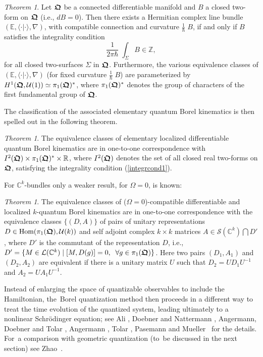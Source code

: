 \documentclass[12pt]{amsart}
\numberwithin{equation}{section}
\theoremstyle{remark}
\newtheorem{theorem}[defi]{Theorem}
\newcommand{\betheo}{\begin{theorem}}
\newcommand{\entheo}{\end{theorem}}
\newcommand{\be}{\begin{equation}}
\newcommand{\en}{\end{equation}}
\newcommand{\bfrakQ}{\mbox{\boldmath $\mathfrak Q$}}
\begin{document}
\betheo
Let $\bfrakQ$ be a connected differentiable manifold and $B$ a closed two-form
on $\bfrakQ$ (i.e., $dB = 0$). Then there exists a Hermitian complex line
bundle $(\mathbb E , \langle\cdot \vert\cdot\rangle , \nabla )$, with
compatible connection and curvature $\frac 1\hbar\;B$, if and only if $B$
satisfies the integrality condition
\be
  \frac 1{2\pi\hbar}\; \int_{\Sigma}B \in \mathbb Z ,
\label{integrcond1}
\en
for all closed two-surfaces $\Sigma$ in $\bfrakQ$. Furthermore, the various
equivalence classes of  $(\mathbb E , \langle\cdot\vert\cdot\rangle , \nabla )$
(for fixed curvature $\frac 1\hbar\;B$) are parameterized by $H^1 (\bfrakQ,
{\mathcal U}(1))\simeq \pi_1 (\bfrakQ )^*$, where $\pi_1 (\bfrakQ )^*$ denotes
the group of characters of the first fundamental group of $\bfrakQ$.
\entheo

The classification of the associated elementary quantum Borel kinematics is
then spelled out in the following theorem.

\betheo\label{classiftheo}
The equivalence classes of elementary localized
differentiable quantum Borel kinematics are in one-to-one correspondence with
$I^2 (\bfrakQ )\times \pi_1 (\bfrakQ )^* \times {\mathbb R}$, where $I^2
(\bfrakQ )$ denotes the set of all closed real two-forms on $\bfrakQ$,
satisfying the integrality condition (\ref{integrcond1}).
\entheo

For ${\mathbb C}^k$-bundles only a weaker result, for $\Omega = 0$, is known:

\betheo
The equivalence classes of ($\Omega = 0$)-compatible differentiable and
localized $k$-quantum Borel kinematics are in one-to-one correspondence with
the equivalence classes $\{(D, A)\}$ of pairs of unitary representations
$D \in \mbox{\rm Hom}(\pi_1 (\bfrakQ ), {\mathcal U} (k))$ and self adjoint
complex $k\times k$ matrices $A \in {\mathcal S}({\mathbb C}^k )\bigcap D'$,
where $D'$ is the commutant of the representation $D$, i.e.,
$D' = \{ M \in {\mathcal L} ({\mathbb C}^k )\;\vert\; [M, D(g)] = 0, \;\;
\forall g \in \pi_1 (\bfrakQ )\}$. Here two pairs $(D_1, A_1 )$ and
$(D_2 , A_2 )$ are equivalent if there is a unitary matrix $U$ such that
$D_2 = UD_1 U^{-1}$ and $A_2 = UA_1 U^{-1}$.
\entheo

Instead of enlarging the space of quantizable observables to include the
Hamiltonian, the~Borel quantization method then proceeds in a different way to
treat the time evolution of the quantized system, leading ultimately to a
nonlinear Schr\"odinger equation; see Ali \cite{bib:AliSurv}, Doebner and
Nattermann \cite{bib:DoebNa}, Angermann, Doebner and Tolar \cite{bib:ADT},
Angermann \cite{bib:Angm}, Tolar \cite{bib:Tolar}, Pasemann \cite{bib:Pasem}
and Mueller~\cite{bib:Muell} for the details. For~a comparison with geometric
quantization (to~be discussed in the next section) see Zhao~\cite{bib:ZhaoQ}.
\end{document}
